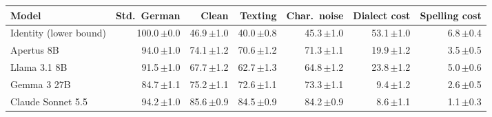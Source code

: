 \begin{tabular}{lrrrrrr}
\toprule
Model & Std.\ German & Clean & Texting & Char.\ noise & Dialect cost & Spelling cost \\
\midrule
Identity (lower bound) & 100.0\,{\scriptsize$\pm$0.0} & 46.9\,{\scriptsize$\pm$1.0} & 40.0\,{\scriptsize$\pm$0.8} & 45.3\,{\scriptsize$\pm$1.0} & 53.1\,{\scriptsize$\pm$1.0} & 6.8\,{\scriptsize$\pm$0.4} \\
Apertus 8B & 94.0\,{\scriptsize$\pm$1.0} & 74.1\,{\scriptsize$\pm$1.2} & 70.6\,{\scriptsize$\pm$1.2} & 71.3\,{\scriptsize$\pm$1.1} & 19.9\,{\scriptsize$\pm$1.2} & 3.5\,{\scriptsize$\pm$0.5} \\
Llama 3.1 8B & 91.5\,{\scriptsize$\pm$1.0} & 67.7\,{\scriptsize$\pm$1.2} & 62.7\,{\scriptsize$\pm$1.3} & 64.8\,{\scriptsize$\pm$1.2} & 23.8\,{\scriptsize$\pm$1.2} & 5.0\,{\scriptsize$\pm$0.6} \\
Gemma 3 27B & 84.7\,{\scriptsize$\pm$1.1} & 75.2\,{\scriptsize$\pm$1.1} & 72.6\,{\scriptsize$\pm$1.1} & 73.3\,{\scriptsize$\pm$1.1} & 9.4\,{\scriptsize$\pm$1.2} & 2.6\,{\scriptsize$\pm$0.5} \\
Claude Sonnet 5.5 & 94.2\,{\scriptsize$\pm$1.0} & 85.6\,{\scriptsize$\pm$0.9} & 84.5\,{\scriptsize$\pm$0.9} & 84.2\,{\scriptsize$\pm$0.9} & 8.6\,{\scriptsize$\pm$1.1} & 1.1\,{\scriptsize$\pm$0.3} \\
\bottomrule
\end{tabular}

